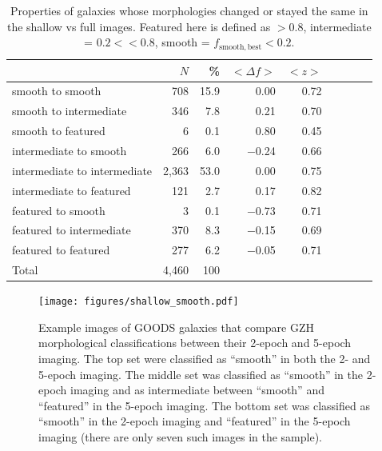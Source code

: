 \documentclass[a4paper,fleqn,usenatbib]{mnras}
\begin{document}
\begin{table}
\caption{Properties of galaxies whose morphologies changed or stayed the same
in the shallow vs full images. Featured here is defined as \fbest$>0.8$,
intermediate = $0.2<$\fbest$<0.8$, smooth = $f_\mathrm{smooth,best}<0.2$.
\label{tbl:shallow_to_full_stats}}
\begin{tabular}{lrrrrrrrr}
\hline\hline
                              & $N$     & \%       & $<\Delta f>$ & $<z>$   \\
\hline
smooth to smooth              & 708     & 15.9     &    0.00      &  0.72   \\
smooth to intermediate        & 346     & 7.8      &    0.21      &  0.70   \\
smooth to featured            & 6       & 0.1      &    0.80      &  0.45   \\ 
intermediate to smooth        & 266     & 6.0      & $-$0.24      &  0.66   \\
intermediate to intermediate  & 2,363   & 53.0     &    0.00      &  0.75   \\
intermediate to featured      & 121     & 2.7      &    0.17      &  0.82   \\
featured to smooth            & 3       & 0.1      & $-$0.73      &  0.71   \\
featured to intermediate      & 370     & 8.3      & $-$0.15      &  0.69   \\
featured to featured          & 277     & 6.2      & $-$0.05      &  0.71   \\
\hline
Total                         & 4,460   & 100      &              &         \\
\hline\hline
\end{tabular}
\end{table}

\begin{figure}
\centering
\texttt{[image: figures/shallow\_smooth.pdf]}
\caption{Example images of GOODS galaxies that compare GZH morphological
classifications between their 2-epoch and 5-epoch imaging.  The top set
were classified as ``smooth'' in both the 2- and 5-epoch imaging. The
middle set was classified as ``smooth'' in the 2-epoch imaging and as
intermediate between ``smooth'' and ``featured'' in the 5-epoch imaging. The
bottom set was classified as ``smooth'' in the 2-epoch imaging and
``featured'' in the 5-epoch imaging (there are only seven such images
in the sample).}
\label{fig:shallow_smooth}
\end{figure}
\end{document}
